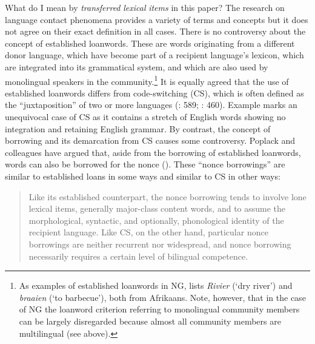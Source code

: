 \documentclass[output=paper]{langsci/langscibook}
\begin{document}
What do I mean by \textit{transferred} \textit{lexical} \textit{items} in this paper? The research on language contact phenomena provides a variety of terms and concepts but it does not agree on their exact definition in all cases. There is no controversy about the concept of established loanwords. These are words originating from a different donor language, which have become part of a recipient language’s lexicon, which are integrated into its grammatical system, and which are also used by monolingual speakers in the community.\footnote{As examples of established loanwords in NG, \citet[1185]{zimmer_deutsch_2019} lists \textit{Rivier} (‘dry river’) and \textit{braaien} (‘to barbecue’), both from Afrikaans. Note, however, that in the case of NG the loanword criterion referring to monolingual community members can be largely disregarded because almost all community members are multilingual (see above).} It is equally agreed that the use of established loanwords differs from code-switching (CS), which is often defined as the “juxtaposition” of two or more languages (\citealt{poplack_code-switching_2004}: 589; \citealt{Auer.2011}: 460). Example  marks an unequivocal case of CS as it contains a stretch of English words showing no integration and retaining English grammar. By contrast, the concept of borrowing and its demarcation from CS causes some controversy. Poplack and colleagues have argued that, aside from the borrowing of established loanwords, words can also be borrowed for the nonce (\citealt{poplack_social_1988, poplack_code-switching_2004, poplack_borrowing_2018}). These “nonce borrowings” are similar to established loans in some ways and similar to CS in other ways:

\begin{quotation}
Like its established counterpart, the nonce borrowing tends to involve lone lexical items, generally major-class content words, and to assume the morphological, syntactic, and optionally, phonological identity of the recipient language. Like CS, on the other hand, particular nonce borrowings are neither recurrent nor widespread, and nonce borrowing necessarily requires a certain level of bilingual competence. \citep[590]{poplack_code-switching_2004}\end{quotation}
\end{document}
